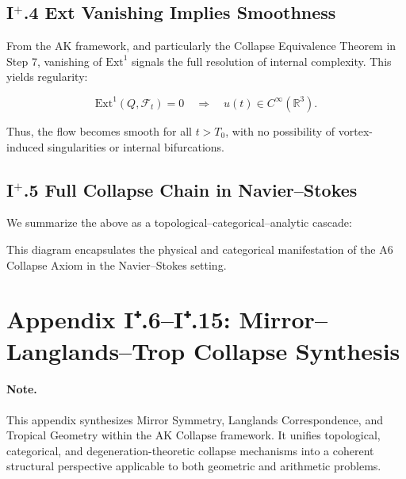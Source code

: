 \documentclass[11pt]{article}
\begin{document}
\subsection*{I$^+$.4 Ext Vanishing Implies Smoothness}

From the AK framework, and particularly the Collapse Equivalence Theorem in Step 7,  
vanishing of \( \mathrm{Ext}^1 \) signals the full resolution of internal complexity.  
This yields regularity:

\[
\mathrm{Ext}^1(Q, \mathcal{F}_t) = 0 \quad \Rightarrow \quad u(t) \in C^\infty(\mathbb{R}^3).
\]

Thus, the flow becomes smooth for all \( t > T_0 \), with no possibility  
of vortex-induced singularities or internal bifurcations.

\subsection*{I$^+$.5 Full Collapse Chain in Navier--Stokes}

We summarize the above as a topological–categorical–analytic cascade:

\begin{center}
\end{center}

This diagram encapsulates the physical and categorical manifestation  
of the A6 Collapse Axiom in the Navier--Stokes setting.




\section*{Appendix I⁺.6–I⁺.15: Mirror–Langlands–Trop Collapse Synthesis}

\paragraph{Note.}  
This appendix synthesizes Mirror Symmetry, Langlands Correspondence, and Tropical Geometry  
within the AK Collapse framework. It unifies topological, categorical, and degeneration-theoretic  
collapse mechanisms into a coherent structural perspective applicable to both geometric and arithmetic problems.
\end{document}
